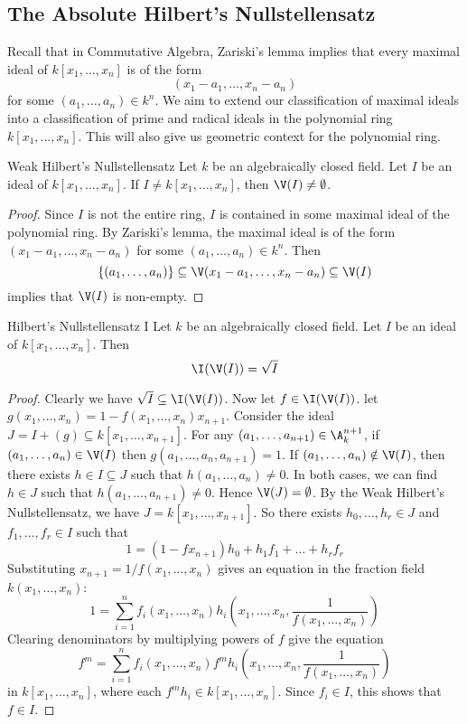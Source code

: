 \documentclass[a4paper]{article}
\begin{document}
\subsection{The Absolute Hilbert's Nullstellensatz}
Recall that in Commutative Algebra, Zariski's lemma implies that every maximal ideal of $k[x_1,\dots,x_n]$ is of the form $$(x_1-a_1,\dots,x_n-a_n)$$ for some $(a_1,\dots,a_n)\in k^n$. We aim to extend our classification of maximal ideals into a classification of prime and radical ideals in the polynomial ring $k[x_1,\dots,x_n]$. This will also give us geometric context for the polynomial ring. 

\begin{thm}{Weak Hilbert's Nullstellensatz}{} Let $k$ be an algebraically closed field. Let $I$ be an ideal of $k[x_1,\dots,x_n]$. If $I\neq k[x_1,\dots,x_n]$, then $\V(I)\neq\emptyset$. \tcbline
\begin{proof}
Since $I$ is not the entire ring, $I$ is contained in some maximal ideal of the polynomial ring. By Zariski's lemma, the maximal ideal is of the form $(x_1-a_1,\dots,x_n-a_n)$ for some $(a_1,\dots,a_n)\in k^n$. Then $$\{(a_1,\dots,a_n)\}\subseteq\V(x_1-a_1,\dots,x_n-a_n)\subseteq\V(I)$$ implies that $\V(I)$ is non-empty. 
\end{proof}
\end{thm}

\begin{thm}{Hilbert's Nullstellensatz I}{} Let $k$ be an algebraically closed field. Let $I$ be an ideal of $k[x_1,\dots,x_n]$. Then $$\I(\V(I))=\sqrt{I}$$ \tcbline
\begin{proof}
Clearly we have $\sqrt{I}\subseteq\I(\V(I))$. Now let $f\in\I(\V(I))$. let $g(x_1,\dots,x_n)=1-f(x_1,\dots,x_n)x_{n+1}$. Consider the ideal $J=I+(g)\subseteq k[x_1,\dots,x_{n+1}]$. For any $(a_1,\dots,a_{n+1})\in\A_k^{n+1}$, if $(a_1,\dots,a_n)\in\V(I)$ then $g(a_1,\dots,a_n,a_{n+1})=1$. If $(a_1,\dots,a_n)\notin\V(I)$, then there exists $h\in I\subseteq J$ such that $h(a_1,\dots,a_n)\neq 0$. In both cases, we can find $h\in J$ such that $h(a_1,\dots,a_{n+1})\neq 0$. Hence $\V(J)=\emptyset$. By the Weak Hilbert's Nullstellensatz, we have $J=k[x_1,\dots,x_{n+1}]$. So there exists $h_0,\dots,h_r\in J$ and $f_1,\dots,f_r\in I$ such that $$1=(1-fx_{n+1})h_0+h_1f_1+\dots+h_rf_r$$ Substituting $x_{n+1}=1/f(x_1,\dots,x_n)$ gives an equation in the fraction field $k(x_1,\dots,x_n)$: $$1=\sum_{i=1}^nf_i(x_1,\dots,x_n)h_i\left(x_1,\dots,x_n,\frac{1}{f(x_1,\dots,x_n)}\right)$$ Clearing denominators by multiplying powers of $f$ give the equation $$f^m=\sum_{i=1}^nf_i(x_1,\dots,x_n)f^mh_i\left(x_1,\dots,x_n,\frac{1}{f(x_1,\dots,x_n)}\right)$$ in $k[x_1,\dots,x_n]$, where each $f^mh_i\in k[x_1,\dots,x_n]$. Since $f_i\in I$, this shows that $f\in I$. 
\end{proof}
\end{thm}
\end{document}
